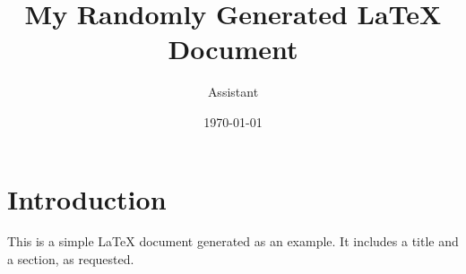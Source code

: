 \documentclass{article}
\title{My Randomly Generated LaTeX Document}
\author{Assistant}
\date{\today}
\begin{document}
\maketitle

\section{Introduction}
This is a simple LaTeX document generated as an example. It includes a title and a section, as requested.
\end{document}
